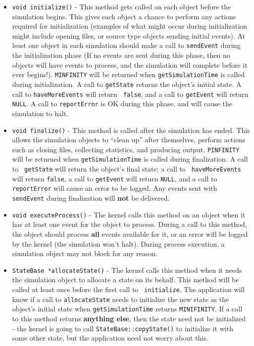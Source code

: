 \documentclass[11pt]{article}
\begin{document}
\begin{itemize}

\item{\tt void initialize()} - This method gets called on each object
  before the simulation begins.  This gives each object a chance to
  perform any actions required for initialization (examples of what might
  occur during initialization might include opening files, or source type
  objects sending initial events).  At least one object in each simulation
  should make a call to {\tt sendEvent} during the initialization phase
  (If no events are sent during this phase, then no objects will have
  events to process, and the simulation will complete before it ever
  begins!). {\tt MINFINITY} will be returned when {\tt getSimulationTime}
  is called during initialization. A call to {\tt getState} returns the
  object's initial state.  A call to {\tt haveMoreEvents} will return {\tt
  false}, and a call to {\tt getEvent} will return {\tt NULL}.  A call to
  {\tt reportError} is OK during this phase, and will cause the simulation
  to halt.

\item{\tt void finalize()} - This method is called after the simulation has
  ended.  This allows the simulation objects to ``clean up'' after
  themselves, perform actions such as closing files, collecting
  statistics, and producing output.  {\tt PINFINITY} will be returned when
  {\tt getSimulationTime} is called during finalization. A call to {\tt
  getState} will return the object's final state; a call to {\tt
  haveMoreEvents} will return {\tt false}, a call to {\tt getEvent} will
  return {\tt NULL}, and a call to {\tt reportError} will cause an error
  to be logged.  Any events sent with {\tt sendEvent} during finalization
  will {\bf not} be delivered.

\item{\tt void executeProcess()} - The kernel calls this method on an
  object when it has at least one event for the object to process.  During
  a call to this method, the object should process {\bf all} events
  available for it, or an error will be logged by the kernel (the
  simulation won't halt).  During process execution, a simulation object
  may not block for any reason.

\item{\tt StateBase *allocateState()} - The ker\-nel calls this method
  when it needs the simulation object to allocate a state on its behalf.
  This method will be called at least once before the first call to {\tt
  initialize}.  The application will know if a call to {\tt allocateState}
  needs to initialize the new state as the object's initial state when
  {\tt getSimulationTime} returns {\tt MINIFINITY}.  If a call to this
  method returns {\bf anything else}, then the state need not be
  initialized - the kernel is going to call {\tt StateBase::copyState()}
  to initialize it with some other state, but the application need not
  worry about this.


\end{itemize}
\end{document}
